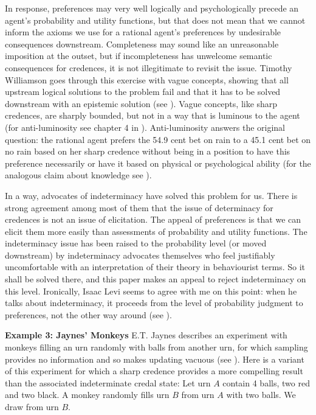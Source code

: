 In response, preferences may very well logically and
psychologically precede an agent's probability and
utility functions, but that does not mean that we
cannot inform the axioms we use for a rational agent's
preferences by undesirable consequences downstream.
Completeness may sound like an unreasonable imposition
at the outset, but if incompleteness has unwelcome
semantic consequences for credences, it is not
illegitimate to revisit the issue. Timothy Williamson
goes through this exercise with vague concepts, showing
that all upstream logical solutions to the problem fail
and that it has to be solved downstream with an
epistemic solution (see ).
Vague concepts, like sharp credences, are sharply
bounded, but not in a way that is luminous to the agent
(for anti-luminosity see chapter 4 in
). Anti-luminosity answers the
original question: the rational agent prefers the 54.9
cent bet on rain to a 45.1 cent bet on no rain based on
her sharp credence without being in a position to have
this preference necessarily or have it based on
physical or psychological ability (for the analogous
claim about knowledge see ).

In a way, advocates of indeterminacy have solved this
problem for us. There is strong agreement among most of
them that the issue of determinacy for credences is not
an issue of elicitation. The appeal of preferences is
that we can elicit them more easily than assessments of
probability and utility functions. The indeterminacy
issue has been raised to the probability level (or
moved downstream) by indeterminacy advocates themselves
who feel justifiably uncomfortable with an
interpretation of their theory in behaviourist terms.
So it shall be solved there, and this paper makes an
appeal to reject indeterminacy on this level.
Ironically, Isaac Levi seems to agree with me on this
point: when he talks about indeterminacy, it proceeds
from the level of probability judgment to preferences,
not the other way around (see ).

\begin{quotex}
  \textbf{Example 3: Jaynes' Monkeys} E.T. Jaynes
  describes an experiment with monkeys filling an urn
  randomly with balls from another urn, for which
  sampling provides no information and so makes
  updating vacuous (see
  ). Here is a
  variant of this experiment for which a sharp credence
  provides a more compelling result than the associated
  indeterminate credal state: Let urn $A$ contain 4
  balls, two red and two black. A monkey randomly fills
  urn $B$ from urn $A$ with two balls. We draw from urn
  $B$.
\end{quotex}

